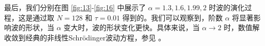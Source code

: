   最后，我们分别在图 \ref{fig:13}-\ref{fig:16} 中展示了 $\alpha=1.3,1.6,1.99,2$ 时波的演化过程，这是通过取 $N=128$ 和 $\tau=0.01$ 得到的。我们可以观察到，阶数 $\alpha$ 将显著影响波的形状，当 $\alpha$ 变大时，波的形状变化更快。具体来说，当 $\alpha \rightarrow 2$ 时，数值解收敛到经典的非线性Schr{\"o}dinger波动方程，参见 \cite{zhangConservativeNumericalScheme2003,liCompactFiniteDifference2012,wangAnalysisNewConservative2006}。

  \begin{figure}[H]
	\begin{center}
	  \\
\end{center}
\end{figure}
